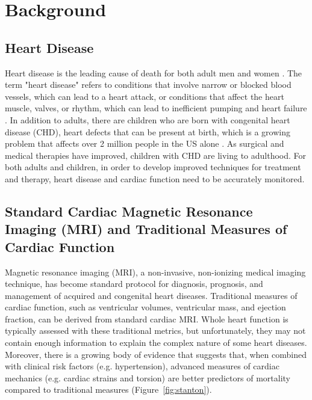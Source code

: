 \chapter{Background}

\section{Heart Disease}
	Heart disease is the leading cause of death for both adult men and women \cite{CDC2015}. The term "heart disease" refers to conditions that involve narrow or blocked blood vessels, which can lead to a heart attack, or conditions that affect the heart muscle, valves, or rhythm, which can lead to inefficient pumping and heart failure \cite{CDC2015}. In addition to adults, there are children who are born with congenital heart disease (CHD), heart defects that can be present at birth, which is a growing problem that affects over 2 million people in the US alone \cite{Rosamond2007}. As surgical and medical therapies have improved, children with CHD are living to adulthood. For both adults and children, in order to develop improved techniques for treatment and therapy, heart disease and cardiac function need to be accurately monitored.

\section{Standard Cardiac Magnetic Resonance Imaging (MRI) and Traditional Measures of Cardiac Function}
	Magnetic resonance imaging (MRI), a non-invasive, non-ionizing medical imaging technique, has become standard protocol for diagnosis, prognosis, and management of acquired and congenital heart diseases. Traditional measures of cardiac function, such as ventricular volumes, ventricular mass, and ejection fraction, can be derived from standard cardiac MRI. Whole heart function is typically assessed with these traditional metrics, but unfortunately, they may not contain enough information to explain the complex nature of some heart diseases. Moreover, there is a growing body of evidence that suggests that, when combined with clinical risk factors (e.g. hypertension), advanced measures of cardiac mechanics (e.g. cardiac strains and torsion) are better predictors of mortality compared to traditional measures \cite{Stanton2009} (Figure~\ref{fig:stanton}).

